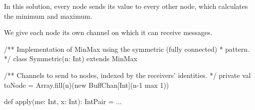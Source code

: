 \documentclass[notes,color]{sepslide0}
\begin{document}













\begin{slide}

In this solution, every node sends its value to every other node, which
calculates the minimum and maximum.

We give each node its own channel on which it can receive messages.
\begin{scala}
/** Implementation of MinMax using the symmetric (fully connected)
  * pattern. */
class Symmetric(n: Int) extends MinMax{
  /** Channels to send to nodes, indexed by the receivers' identities. */
  private val toNode = Array.fill(n)(new BuffChan[Int](n-1 max 1))

  def apply(me: Int, x: Int): IntPair = ...
}
\end{scala}
\end{slide}
\end{document}
